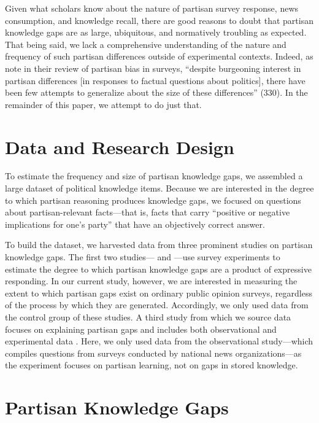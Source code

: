 \documentclass[12pt, letterpaper]{article}
\begin{document}
Given what scholars know about the nature of partisan survey response, news consumption, and knowledge recall, there are good reasons to doubt that partisan knowledge gaps are as large, ubiquitous, and normatively troubling as expected. That being said, we lack a comprehensive understanding of the nature and frequency of such partisan differences outside of experimental contexts. Indeed, as \citet{bullocklenz_2019} note in their review of partisan bias in surveys, ``despite burgeoning interest in partisan differences [in responses to factual questions about politics], there have been few attempts to generalize about the size of these differences'' (330).  In the remainder of this paper, we attempt to do just that.

\section*{Data and Research Design}

To estimate the frequency and size of partisan knowledge gaps, we assembled a large dataset of political knowledge items. Because we are interested in the degree to which partisan reasoning produces knowledge gaps, we focused on questions about partisan-relevant facts---that is, facts that carry ``positive or negative implications for one's party'' \citep[][673]{jerit2012partisan} that have an objectively correct answer.

To build the dataset, we harvested data from three prominent studies on partisan knowledge gaps. The first two studies---\citet{bullocketal_2015} and \citet{prior2015you}---use survey experiments to estimate the degree to which partisan knowledge gaps are a product of expressive responding. In our current study, however, we are interested in measuring the extent to which partisan gaps exist on ordinary public opinion surveys, regardless of the process by which they are generated. Accordingly, we only used data from the control group of these studies. A third study from which we source data focuses on explaining partisan gaps and includes both observational and experimental data \citep{jerit2012partisan}. Here, we only used data from the observational study---which compiles questions from surveys conducted by national news organizations---as the experiment focuses on partisan learning, not on gaps in stored knowledge. 

\section*{Partisan Knowledge Gaps}
\end{document}
